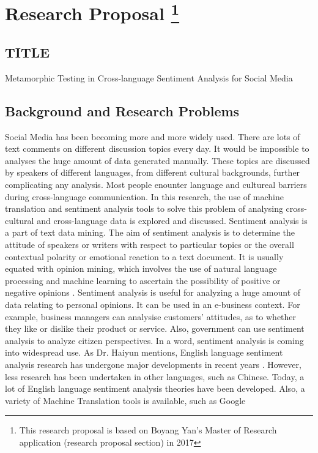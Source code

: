 \documentclass[conference]{IEEEtran}
\begin{document}
\section{Research Proposal \protect\footnote{This research proposal is based on
    Boyang Yan's Master of Research application (research proposal section) in
    2017}}
\subsection{TITLE}
Metamorphic Testing in Cross-language Sentiment Analysis for Social Media
\subsection{Background and Research Problems}
Social Media has been becoming more and more widely used. There are lots of text comments
on different discussion topics every day.
It would be impossible to analyses the huge amount of data generated manually.
These topics are discussed by speakers of different languages, from different
cultural backgrounds, further complicating any analysis.
Most people enounter language and cultureal barriers during cross-language
communication.
In this research, the use of machine translation and sentiment analysis tools to
solve this problem of analysing cross-cultural and cross-language data is
explored and discussed.
Sentiment analysis is a part of text data mining. The aim of sentiment analysis
is to determine the attitude of speakers or writers with respect to particular topics
or the overall contextual polarity or emotional reaction to a text document. It is usually equated with
opinion mining, which involves the use of natural language processing and
machine learning to ascertain the possibility of positive or negative opinions
\cite{sentimentAnalysis}.
Sentiment analysis is useful for analyzing a huge amount of data relating to personal
opinions. It can be used in an e-business context. For example, business managers can analysise
customers' attitudes, as to whether they like or dislike their product or service.
Also, government can use sentiment analysis to analyze citizen perspectives.
In a word, sentiment analysis is coming into widespread use.
As Dr. Haiyun mentions, English language sentiment analysis research has
undergone major developments in recent years \cite{ChineseSentimentAnalysis}.
However, less research has been undertaken in other languages, such as Chinese.
Today, a lot of English language sentiment analysis theories have been
developed. Also, a variety of Machine Translation tools is available, such as Google
\end{document}

